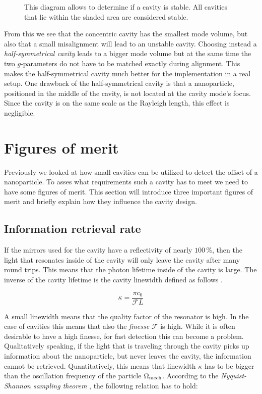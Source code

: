 \begin{figure}[H]
	
	\caption{This diagram allows to determine if a cavity is stable. All cavities that lie within the shaded area are considered stable.}
	\label{fig:CavityStabilityDiagram}
\end{figure}

From this we see that the concentric cavity has the smallest mode volume, but also that a small misalignment will lead to an unstable cavity. Choosing instead a \textit{half-symmetrical cavity} leads to a bigger mode volume but at the same time the two $g$-parameters do not have to be matched exactly during alignment. This makes the half-symmetrical cavity much better for the implementation in a real setup. One drawback of the half-symmetrical cavity is that a nanoparticle, positioned in the middle of the cavity, is not located at the cavity mode's focus. Since the cavity is on the same scale as the Rayleigh length, this effect is negligible.

\section{Figures of merit}
Previously we looked at how small cavities can be utilized to detect the offset of a nanoparticle. To asses what requirements such a cavity has to meet we need to have some figures of merit. This section will introduce three important figures of merit and briefly explain how they influence the cavity design.

\subsection{Information retrieval rate}\label{ChapInformationRetrievalRate}
If the mirrors used for the cavity have a reflectivity of nearly $100\,\%$, then the light that resonates inside of the cavity will only leave the cavity after many round trips. This means that the photon lifetime inside of the cavity is large. The inverse of the cavity lifetime is the cavity linewidth defined as follows \cite{chang2010cavity}.

\begin{equation}
	\kappa = \frac{\pi c_0}{\mathcal{F}L}
\end{equation}

A small linewidth means that the quality factor of the resonator is high. In the case of cavities this means that also the \textit{finesse} $\mathcal{F}$ is high. While it is often desirable to have a high finesse, for fast detection this can become a problem. Qualitatively speaking, if the light that is traveling through the cavity picks up information about the nanoparticle, but never leaves the cavity, the information cannot be retrieved. Quantitatively, this means that linewidth $\kappa$ has to be bigger than the oscillation frequency of the particle $\de{\Omega}{mech}$. According to the \textit{Nyquist-Shannon sampling theorem} \cite{shannon1949communication}, the following relation has to hold:

